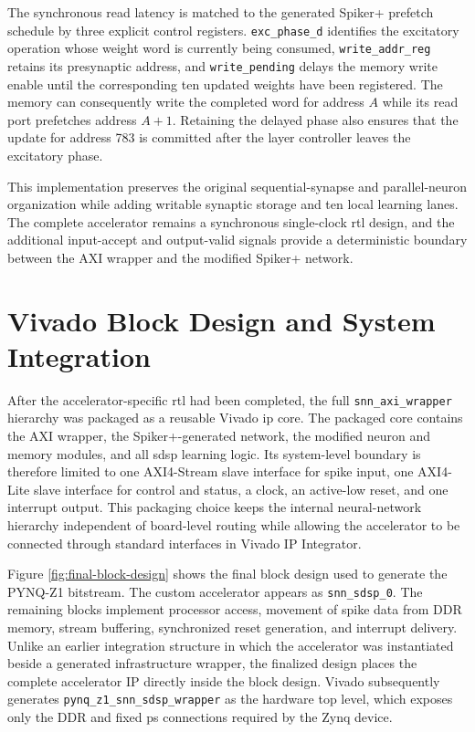 The synchronous read latency is matched to the generated Spiker+ prefetch schedule by three explicit control registers. \texttt{exc\_phase\_d} identifies the excitatory operation whose weight word is currently being consumed, \texttt{write\_addr\_reg} retains its presynaptic address, and \texttt{write\_pending} delays the memory write enable until the corresponding ten updated weights have been registered. The memory can consequently write the completed word for address \(A\) while its read port prefetches address \(A+1\). Retaining the delayed phase also ensures that the update for address 783 is committed after the layer controller leaves the excitatory phase.

This implementation preserves the original sequential-synapse and parallel-neuron organization while adding writable synaptic storage and ten local learning lanes. The complete accelerator remains a synchronous single-clock \gls{rtl} design, and the additional input-accept and output-valid signals provide a deterministic boundary between the AXI wrapper and the modified Spiker+ network.

\section{Vivado Block Design and System Integration}
\label{subsec:block-design-integration}

After the accelerator-specific \gls{rtl} had been completed, the full \texttt{snn\_axi\_wrapper} hierarchy was packaged as a reusable Vivado \gls{ip} core. The packaged core contains the AXI wrapper, the Spiker+-generated network, the modified neuron and memory modules, and all \gls{sdsp} learning logic. Its system-level boundary is therefore limited to one AXI4-Stream slave interface for spike input, one AXI4-Lite slave interface for control and status, a clock, an active-low reset, and one interrupt output. This packaging choice keeps the internal neural-network hierarchy independent of board-level routing while allowing the accelerator to be connected through standard interfaces in Vivado IP Integrator.

Figure \ref{fig:final-block-design} shows the final block design used to generate the PYNQ-Z1 bitstream. The custom accelerator appears as \texttt{snn\_sdsp\_0}. The remaining blocks implement processor access, movement of spike data from DDR memory, stream buffering, synchronized reset generation, and interrupt delivery. Unlike an earlier integration structure in which the accelerator was instantiated beside a generated infrastructure wrapper, the finalized design places the complete accelerator IP directly inside the block design. Vivado subsequently generates \texttt{pynq\_z1\_snn\_sdsp\_wrapper} as the hardware top level, which exposes only the DDR and fixed \gls{ps} connections required by the Zynq device.


